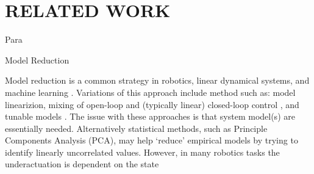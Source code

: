 \documentclass[letterpaper, 10 pt, conference]{ieeeconf}
\begin{document}
\lipsum[1-4]

\section{RELATED WORK}



{Para}






















{Model Reduction}






Model reduction is a common strategy in robotics, linear dynamical systems, and machine learning \cite{betts2010practical, sutton1998reinforcement}.   Variations of this approach include method such as: model linearizion, mixing of open-loop and (typically linear) closed-loop control \cite{kolter2010probabilistic}, and tunable models \cite{maeda2011tuned}.  The issue with these approaches is that system model(s) are essentially needed.  Alternatively statistical methods, such as Principle Components Analysis (PCA), may help `reduce' empirical models by trying to identify linearly uncorrelated values.  However, in many robotics tasks the underactuation is dependent on the state  
\end{document}
